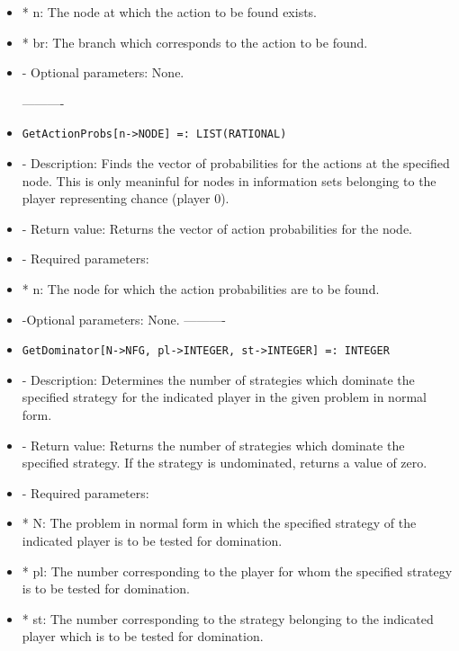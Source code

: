 \begin{itemize}
\bd
\item
*  n:  The node at which the action to be found exists.
\item
*  br:  The branch which corresponds to the action to be found.
\ed

\item
- Optional parameters:  None.
\ed

----------
\item
\begin{verbatim}
GetActionProbs[n->NODE] =: LIST(RATIONAL)
\end{verbatim}

\bd
\item
- Description:  Finds the vector of probabilities for the actions at the
specified node.  This is only meaninful for nodes in information sets 
belonging to the player representing chance (player 0).
\item
- Return value:  Returns the vector of action probabilities for the node.
\item
- Required parameters: 
	
\bd
\item
*  n:  The node for which the action probabilities are to be found.
\ed

\item
-Optional parameters:  None.
\ed
----------

\item
\begin{verbatim}
GetDominator[N->NFG, pl->INTEGER, st->INTEGER] =: INTEGER
\end{verbatim}

\bd
\item
- Description:  Determines the number of strategies which dominate the
specified strategy for the indicated player in the given problem in 
normal form.
\item
- Return value:  Returns the number of strategies which dominate the
specified strategy.  If the strategy is undominated, returns a value
of zero.  
\item
- Required parameters:

\bd
\item
*  N:  The problem in normal form in which the specified strategy of
the indicated player is to be tested for domination.
\item
*  pl:  The number corresponding to the player for whom the specified
strategy is to be tested for domination.
\item
*  st:  The number corresponding to the strategy belonging to the 
indicated player which is to be tested for domination.
\ed


\end{itemize}
